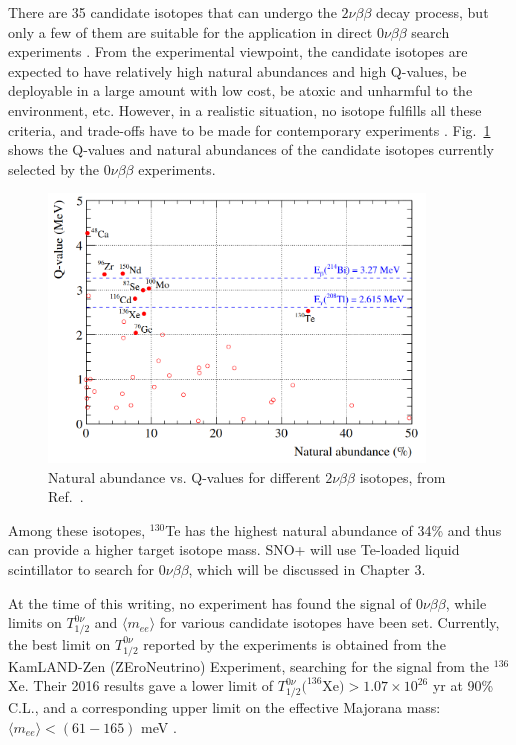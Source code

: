 There are 35 candidate isotopes that can undergo the $2\nu\beta\beta$ decay process, but only a few of them are suitable for the application in direct $0\nu\beta\beta$ search experiments \cite{giunti2007fundamentals}. From the experimental viewpoint, the candidate isotopes are expected to have relatively high natural abundances and high Q-values, be deployable in a large amount with low cost, be atoxic and unharmful to the environment, etc. However, in a realistic situation, no isotope fulfills all these criteria, and trade-offs have to be made for contemporary experiments \cite{dolinski2019neutrinoless}. Fig.~\ref{fig:te_abundance} shows the Q-values and natural abundances of the candidate isotopes currently selected by the $0\nu\beta\beta$ experiments.

\begin{figure}[!htb]
	\centering
	\includegraphics[width=10cm]{Te_abundance.png}
	\caption{Natural abundance vs. Q-values for different $2\nu\beta\beta$ isotopes, from Ref.~\cite{snop_nim_draft}.}
	\label{fig:te_abundance}
\end{figure}

Among these isotopes, $^{130}$Te has the highest natural abundance of 34\% and thus can provide a higher target isotope mass. SNO+ will use Te-loaded liquid scintillator to search for $0\nu\beta\beta$, which will be discussed in Chapter 3. 

At the time of this writing, no experiment has found the signal of $0\nu\beta\beta$, while limits on $T^{0\nu}_{1/2}$ and $\langle m_{ee}\rangle$ for various candidate isotopes have been set. Currently, the best limit on $T^{0\nu}_{1/2}$ reported by the experiments is obtained from the KamLAND-Zen (ZEroNeutrino) Experiment, searching for the signal from the $^{136}$Xe. Their 2016 results gave a lower limit of $T^{0\nu}_{1/2}(^{136}$Xe$)>1.07\times 10^{26}$ yr at 90\% C.L., and a corresponding upper limit on the effective Majorana mass: $\langle m_{ee}\rangle<(61-165)$ meV \cite{gando2016search}. 

